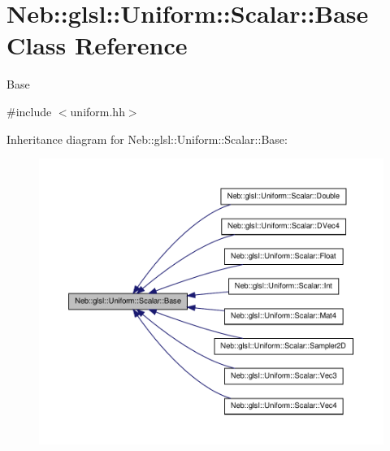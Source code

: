 \hypertarget{classNeb_1_1glsl_1_1Uniform_1_1Scalar_1_1Base}{\section{\-Neb\-:\-:glsl\-:\-:\-Uniform\-:\-:\-Scalar\-:\-:\-Base \-Class \-Reference}
\label{classNeb_1_1glsl_1_1Uniform_1_1Scalar_1_1Base}
}


\-Base  




{\ttfamily \#include $<$uniform.\-hh$>$}



\-Inheritance diagram for \-Neb\-:\-:glsl\-:\-:\-Uniform\-:\-:\-Scalar\-:\-:\-Base\-:\nopagebreak
\begin{figure}[H]
\begin{center}
\leavevmode
\includegraphics[width=350pt]{classNeb_1_1glsl_1_1Uniform_1_1Scalar_1_1Base__inherit__graph}
\end{center}
\end{figure}
